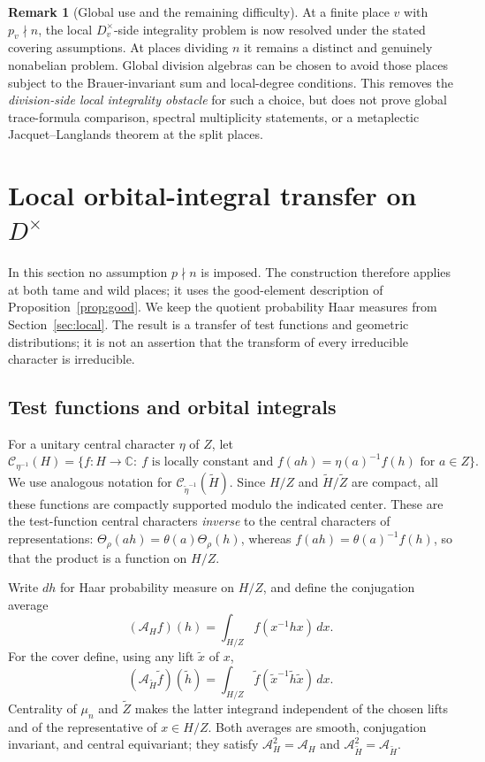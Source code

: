 \documentclass[11pt]{article}
\newcommand{\tH}{\widetilde H}
\newcommand{\tZ}{\widetilde Z}
\theoremstyle{plain}
\theoremstyle{definition}
\newtheorem{remark}[theorem]{Remark}
\begin{document}
\begin{remark}[Global use and the remaining difficulty]\label{rem:global-tame}
At a finite place $v$ with $p_v\nmid n$, the local
$D_v^\times$-side integrality problem is now resolved under
the stated covering assumptions. At places dividing $n$
it remains a distinct and genuinely nonabelian problem.
Global division algebras can be chosen to avoid those places
subject to the Brauer-invariant sum and local-degree
conditions. This removes the \emph{division-side local
integrality obstacle} for such a choice, but does not prove
global trace-formula comparison, spectral multiplicity
statements, or a metaplectic Jacquet--Langlands theorem
at the split places.
\end{remark}

\section{Local orbital-integral transfer on \texorpdfstring{$D^\times$}{D x}}\label{sec:orbital}
In this section no assumption $p\nmid n$ is imposed. The construction therefore
applies at both tame and wild places; it uses the good-element description of
Proposition~\ref{prop:good}. We keep the quotient probability Haar measures from
Section~\ref{sec:local}. The result is a transfer of test functions and geometric
distributions; it is not an assertion that the transform of every irreducible
character is irreducible.

\subsection{Test functions and orbital integrals}
For a unitary central character $\eta$ of $Z$, let
\[
\mathcal C_{\eta^{-1}}(H)
=\{f:H\to\mathbb C:\ f\text{ is locally constant and }
                   f(ah)=\eta(a)^{-1}f(h)\text{ for }a\in Z\}.
\]
We use analogous notation for $\mathcal C_{\widetilde\eta^{-1}}(\tH)$.
Since $H/Z$ and $\tH/\tZ$ are compact, all these functions are compactly
supported modulo the indicated center. These are the test-function central
characters \emph{inverse} to the central characters of representations:
$\Theta_\rho(ah)=\theta(a)\Theta_\rho(h)$, whereas
$f(ah)=\theta(a)^{-1}f(h)$, so that the product is a function on $H/Z$.

Write $dh$ for Haar probability measure on $H/Z$, and define the
conjugation average
\begin{equation}\label{eq:avg-H}
(\mathcal A_Hf)(h)
=\int_{H/Z}f(x^{-1}hx)\,dx.
\end{equation}
For the cover define, using any lift $\widetilde x$ of $x$,
\begin{equation}\label{eq:avg-cover}
(\mathcal A_{\tH}\widetilde f)(\widetilde h)
=\int_{H/Z}\widetilde f(\widetilde x^{-1}\widetilde h\widetilde x)\,dx.
\end{equation}
Centrality of $\mu_n$ and $\tZ$ makes the latter integrand independent of
the chosen lifts and of the representative of $x\in H/Z$. Both averages
are smooth, conjugation invariant, and central equivariant; they satisfy
$\mathcal A_H^2=\mathcal A_H$ and
$\mathcal A_{\tH}^2=\mathcal A_{\tH}$.
\end{document}
